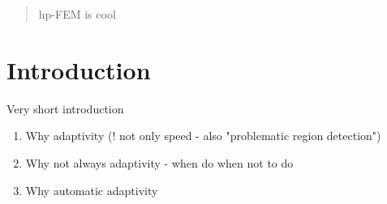 \begin{abstract}
hp-FEM is cool
\end{abstract}

\section{Introduction}
Very short introduction
\begin{enumerate}
\item Why adaptivity (! not only speed - also "problematic region detection")
\item Why not always adaptivity - when do when not to do
\item Why automatic adaptivity
\end{enumerate}